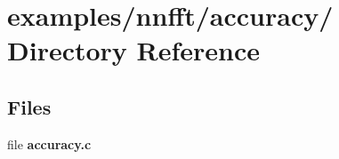 \hypertarget{dir_000002}{
\section{examples/nnfft/accuracy/ Directory Reference}
\label{dir_000002}
}
\subsection*{Files}
\begin{CompactItemize}
\item 
file {\bf accuracy.c}
\end{CompactItemize}
